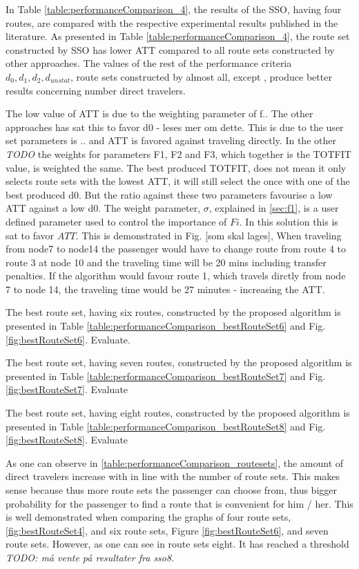 In Table \vref{table:performanceComparison_4}, the results of the SSO, having four routes, are compared with the respective experimental results published in the literature. As presented in Table \vref{table:performanceComparison_4}, the route set constructed by SSO has lower ATT compared to all route sets constructed by other approaches. The values of the rest of the performance criteria $d_0, d_1, d_2, d_{unstat}$, route sets constructed by almost all, except \citep{mandl79, kidwai98, chakroborty02}, produce better results concerning number direct travelers. 

The low value of ATT is due to the weighting parameter of f.. The other approaches has sat this to favor d0 - leses mer om dette. This is due to the user set parameters is .. and ATT is favored against traveling directly. In the other \emph{\color{blue} TODO} the weights for parameters F1, F2 and F3, which together is the TOTFIT value, is weighted the same. The best produced TOTFIT, does not mean it only selects route sets with the lowest ATT, it will still select the once with one of the best produced d0. But the ratio against these two parameters favourise a low ATT against a low d0. The weight parameter, $\sigma$, explained in \vref{sec:f1}, is a user defined parameter used to control the importance of $Fi$. In this solution this is sat to favor $ATT$. This is demonstrated in Fig. [som skal lages], When traveling from node7 to node14 the passenger would have to change route from route 4 to route 3 at node 10 and the traveling time will be 20 mins including transfer penalties. If the algorithm would favour route 1, which travels dirctly from node 7 to node 14, the traveling time would be 27 minutes - increasing the ATT.

The best route set, having six routes, constructed by the proposed algorithm is presented in Table \vref{table:performanceComparison_bestRouteSet6} and Fig. \vref{fig:bestRouteSet6}. 
Evaluate.

The best route set, having seven routes, constructed by the proposed algorithm is presented in Table \vref{table:performanceComparison_bestRouteSet7} and Fig. \vref{fig:bestRouteSet7}. 
Evaluate

The best route set, having eight routes, constructed by the proposed algorithm is presented in Table \vref{table:performanceComparison_bestRouteSet8} and Fig. \vref{fig:bestRouteSet8}.
Evaluate

As one can observe in \vref{table:performanceComparison_routesets}, the amount of direct travelers increase with in line with the number of route sets. This makes sense because thus more route sets the passenger can choose from, thus bigger probability for the passenger to find a route that is convenient for him / her. This is well demonstrated when comparing the graphs of four route sets, \vref{fig:bestRouteSet4}, and six route sets, Figure \vref{fig:bestRouteSet6}, and seven route sets. However, as one can see in route sets eight. It has reached a threshold \emph{\color{blue} TODO: må vente på resultater fra sso8}.

